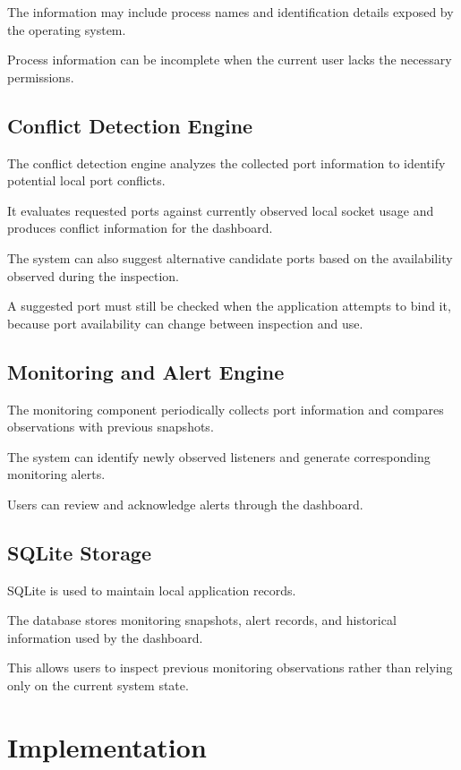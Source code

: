 \documentclass[conference]{IEEEtran}
\begin{document}
The information may include process names and
identification details exposed by the operating
system.

Process information can be incomplete when the
current user lacks the necessary permissions.

\subsection{Conflict Detection Engine}

The conflict detection engine analyzes the collected
port information to identify potential local port
conflicts.

It evaluates requested ports against currently
observed local socket usage and produces conflict
information for the dashboard.

The system can also suggest alternative candidate
ports based on the availability observed during
the inspection.

A suggested port must still be checked when the
application attempts to bind it, because port
availability can change between inspection and use.

\subsection{Monitoring and Alert Engine}

The monitoring component periodically collects
port information and compares observations with
previous snapshots.

The system can identify newly observed listeners
and generate corresponding monitoring alerts.

Users can review and acknowledge alerts through
the dashboard.

\subsection{SQLite Storage}

SQLite is used to maintain local application records.

The database stores monitoring snapshots, alert
records, and historical information used by the
dashboard.

This allows users to inspect previous monitoring
observations rather than relying only on the
current system state.

\section{Implementation}
\end{document}
